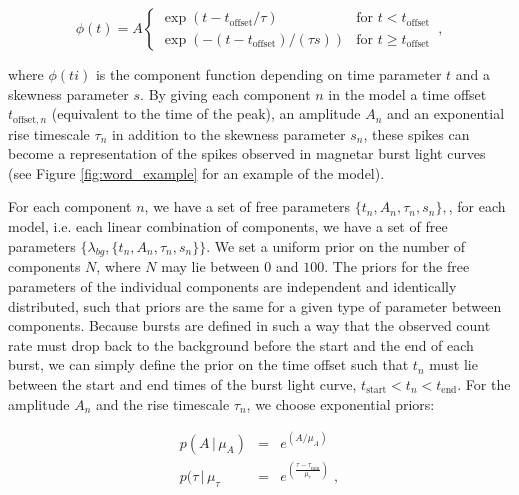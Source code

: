 \documentclass[12pt]{emulateapj}
\newcommand{\given}{\,|\,}
\newcommand{\dd}{\mathrm{d}}
\newcommand{\counts}{y}
\newcommand{\pars}{\theta}
\newcommand{\mean}{\lambda}
\newcommand{\Poisson}{{\mathcal P}}
\newcommand{\bg}{\mathrm{bg}}
\newcommand{\word}{\phi}
\begin{document}
\begin{equation}
\word(t) = A \left\{\begin{array}{ll}\exp(t-t_{\mathrm{offset}}/\tau) & \mbox{for $t < t_{\mathrm{offset}}$}\\ 
\exp(-(t-t_{\mathrm{offset}})/(\tau s)) & \mbox{for $t \geq t_\mathrm{offset}$}\end{array}\right. \, ,
\end{equation}

where $\word(ti)$ is the component function depending on time parameter $t$ and a skewness
parameter $s$. By giving each component $n$ in the model a time offset $t_{\mathrm{offset},n}$ (equivalent to the time of the peak), 
an amplitude $A_n$ and an exponential rise timescale $\tau_n$ in addition to the skewness parameter $s_n$, 
these spikes can become a representation of the spikes observed in magnetar burst light curves (see Figure \ref{fig:word_example}
for an example of the model).


For each component $n$, we have a set of free parameters $\{t_n, A_n, \tau_n, s_n \},$, for each model, i.e. each
linear combination of components, we have a set of free parameters $\{\mean_{bg}, \{t_n, A_n, \tau_n, s_n\} \}$.
We set a uniform prior on the number of components $N$, where $N$ may lie between $0$ and $100$. 
The priors for the free parameters of the individual components are independent and identically distributed, such that priors 
are the same for a given type of parameter between components. 
Because bursts are defined in such a way that the observed count rate must drop back to the background before the
start and the end of each burst, we can simply define the prior on the time offset such that $t_n$ must lie between
the start and end times of the burst light curve, $t_{\mathrm{start}} < t_n < t_\mathrm{end}$. 
For the amplitude $A_n$ and the rise timescale $\tau_n$, we choose exponential priors:

\begin{eqnarray}
p(A \given \mu_A) &=& e^{(A/\mu_A)} \\
p(\tau \given \mu_{\tau} & = & e^{(\frac{\tau - \tau_{\mathrm{min}}}{\mu_{\mathrm{\tau}}})} \; ,
\end{eqnarray}
\end{document}
